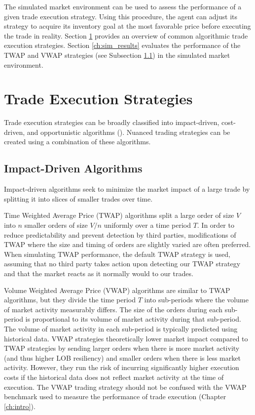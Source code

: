 The simulated market environment can be used to assess the performance of a given trade execution strategy. Using this procedure, the agent can adjust its strategy to acquire its inventory goal at the most favorable price before executing the trade in reality. Section \ref{ch:strategies} provides an overview of common algorithmic trade execution strategies. Section \ref{ch:sim_results} evaluates the performance of the TWAP and VWAP strategies (see Subsection \ref{ch:impact-driven}) in the simulated market environment.

\section{Trade Execution Strategies} \label{ch:strategies}
Trade execution strategies can be broadly classified into impact-driven, cost-driven, and opportunistic algorithms (\cite{labadie:hal-00590283}). Nuanced trading strategies can be created using a combination of these algorithms.

\subsection{Impact-Driven Algorithms} \label{ch:impact-driven}
Impact-driven algorithms seek to minimize the market impact of a large trade by splitting it into slices of smaller trades over time. 

Time Weighted Average Price (TWAP) algorithms split a large order of size $V$ into $n$ smaller orders of size $V/n$ uniformly over a time period $T$. In order to reduce predictability and prevent detection by third parties, modifications of TWAP where the size and timing of orders are slightly varied are often preferred. When simulating TWAP performance, the default TWAP strategy is used, assuming that no third party takes action upon detecting our TWAP strategy and that the market reacts as it normally would to our trades.

Volume Weighted Average Price (VWAP) algorithms are similar to TWAP algorithms, but they divide the time period $T$ into sub-periods where the volume of market activity measurably differs. The size of the orders during each sub-period is proportional to its volume of market activity during that sub-period. The volume of market activity in each sub-period is typically predicted using historical data. VWAP strategies theoretically lower market impact compared to TWAP strategies by sending larger orders when there is more market activity (and thus higher LOB resiliency) and smaller orders when there is less market activity. However, they run the risk of incurring significantly higher execution costs if the historical data does not reflect market activity at the time of execution. The VWAP trading strategy should not be confused with the VWAP benchmark used to measure the performance of trade execution (Chapter \ref{ch:intro}).

